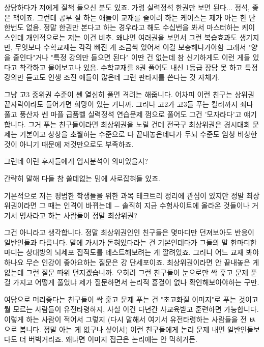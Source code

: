 상담하다가 저에게 질책 들으신 분도 있죠. 가령 실력정석 한권만 보면 된다... 정석, 좋은 책이죠.
그런데 공부 잘 하는 애들이 교재를 줄이려 하는 케이스는 제가 아는 한 단 한번도 없음.
정말 한권만 본다고 하는 경우라고 해도 수십번을 봐서 마스터하는 케이스인데 개인적으로는 저는 이건 비추.
왜냐면 여러권을 보면서 그런 복습효과도 생기지만, 무엇보다 수학교재는 각각 빠진 게 조금씩 있어서 이걸 보충해나가야함
그래서 "양을 줄인다"거나 "특정 강의만 들으면 된다" 이딴 건 없는데 참 신기하게도 이런 게들 있다고 착각하고 물어보고나 있음.
수학교재를 8권 풀어도 내신 1등급 장담 못 하고 특정 강의만 듣고도 인생 조진 애들이 많은데 그런 판타지를 쓴다는 것 자체가.
\vspace{5mm}

그냥 고3 중위권 수준이 쎈 열심히 풀면 격려는 해줍니다. 어차피 이런 친구는 상위권 끝자락이라도 들어가면 희망이 있는 거니까.
그러나 고2가 고3들 푸는 킬러까지 죄다 풀고 풍산자 쎈 마플 급품벨 실력정석 연습문제 껌으로 풀어도 그건 '모자라다'고 얘기합니다.
그거 푸는 친구들이라면 최상위권을 노릴 건데 전국구 최상위권은 경시대회 문제는 기본이고 상상을 초월하는 수준으로 다 끝내놓은데다가
두뇌 수준도 엄청 비상한 것이 아니기 때문에 저것만으로도 부족하죠.
\vspace{5mm}

그런데 이런 후자들에게 입시분석이 의미있을지?
\vspace{5mm}

간략히 말해 다들 참 쓸데없는 밈에 사로잡혀들 있죠.
\vspace{5mm}

기본적으로 저는 평범한 학생들을 위한 과목 테크트리 정리에 관심이 있지만
정말 최상위권이라면 그 때는 인격이 바뀌는데 $-$ 솔직히 지금 수험사이트에 올라온 것들이나
거기서 명사라고 하는 사람들이 정말 최상위권?
\vspace{5mm}

그건 아니라고 생각합니다.
정말 최상위권인인 친구들은 몇마디만 던져보아도 반응이 일반인들과 다릅니다.
말에 가시가 돋혀있다라는 건 기본인데다가 그들의 말 한마디한마디는 상대방의 뇌세포 집적도를 테스트해보려는 게 깔려있죠.
그러니 어느 교재 봐야하나요 무슨 인강이 좋아요하는 질문은 걍 단세포이죠.
최상위권이라면 안 끝내놓은 게 없는데 그런 질문 따위 던지겠습니까.
오히려 그런 친구들이 눈으로만 싹 훑고 문제 푼 걸 가지고 어떻게 풀었냐 제가 질문하면서 논리적 흠결이 없나 확인해보아야하는 구만.
\vspace{5mm}

여담으로 머리좋다는 친구들이 싹 훑고 문제 푸는 건 "초고화질 이미지"로 푸는 것이고
뭘 모르는 사람들이 유전타령하지, 사실 이건 다년간 사교육받고 훈련하면 가능합니다. 이렇게 하는 사람이 적어서 그렇지
(다시 말해서 여기서 유전타령하는 사람들을 전 ㅄ으로 봅니다. 정말 아는 게 없구나 싶어서)
이런 친구들에게 논리 문제 내면 일반인들보다도 더 버벅거리죠. 왜냐면 이미지 접근은 논리에는 안 먹히거든.
\vspace{5mm}







